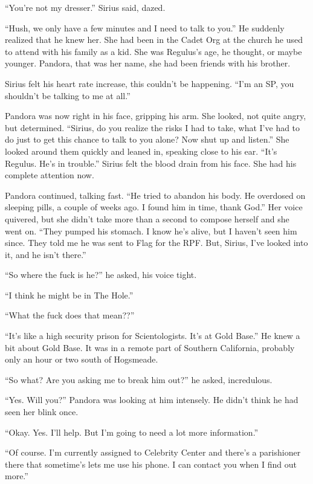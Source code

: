 \documentclass[12pt,twoside,openright]{memoir}
\begin{document}
``You're not my dresser.'' Sirius said, dazed. 

``Hush, we only have a few minutes and I need to talk to you.'' He suddenly realized that he knew her. She had been in the Cadet Org at the church he used to attend with his family as a kid. She was Regulus's age, he thought, or maybe younger. Pandora, that was her name, she had been friends with his brother.

Sirius felt his heart rate increase, this couldn't be happening. ``I'm an SP, you shouldn't be talking to me at all.''

Pandora was now right in his face, gripping his arm. She looked, not quite angry, but determined. ``Sirius, do you realize the risks I had to take, what I've had to do just to get this chance to talk to you alone? Now shut up and listen.'' She looked around them quickly and leaned in, speaking close to his ear. ``It's Regulus. He's in trouble.''
Sirius felt the blood drain from his face. She had his complete attention now.

Pandora continued, talking fast. ``He tried to abandon his body. He overdosed on sleeping pills, a couple of weeks ago. I found him in time, thank God.'' Her voice quivered, but she didn't take more than a second to compose herself and she went on. ``They pumped his stomach. I know he's alive, but I haven't seen him since. They told me he was sent to Flag for the RPF. But, Sirius, I've looked into it, and he isn't there.''

``So where the fuck is he?'' he asked, his voice tight.

``I think he might be in The Hole.''

``What the fuck does that mean??''

``It's like a high security prison for Scientologists. It's at Gold Base.'' He knew a bit about Gold Base. It was in a remote part of Southern California, probably only an hour or two south of Hogsmeade.

``So what? Are you asking me to break him out?'' he asked, incredulous. 

``Yes. Will you?'' Pandora was looking at him intensely. He didn't think he had seen her blink once.

``Okay. Yes. I'll help. But I'm going to need a lot more information.''

``Of course. I'm currently assigned to Celebrity Center and there's a parishioner there that sometime's lets me use his phone. I can contact you when I find out more.'' 
\end{document}
